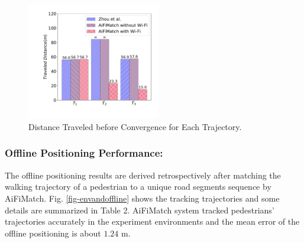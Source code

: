 \documentclass{llncs}
\begin{document}
\begin{figure}[!htbp]
	\centering
	\includegraphics[width=2.3in]{AiFiMatch-Convergence}
	\caption{Distance Traveled before Convergence for Each Trajectory.}
	\label{fig-converg}
\end{figure}

\subsubsection{Offline Positioning Performance:}

The offline positioning results are derived retrospectively after matching the walking trajectory of a pedestrian to a unique road segments sequence by AiFiMatch. Fig. \ref{fig-envandoffline} shows the tracking trajectories and some details are summarized in Table 2. AiFiMatch system tracked pedestrians' trajectories accurately in the experiment environments and the mean error of the offline positioning is about $1.24$ m.
\end{document}
